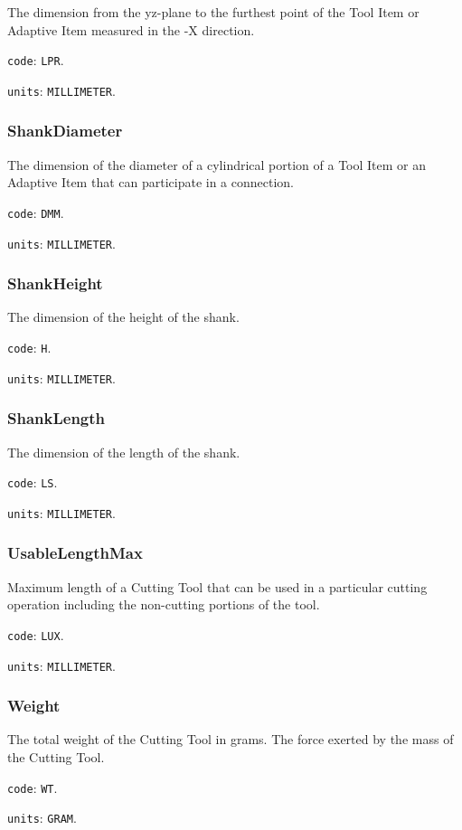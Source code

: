 The dimension from the yz-plane to the furthest point of the Tool Item or Adaptive Item measured in the -X direction.


\texttt{code}: \texttt{LPR}.


\texttt{units}: \texttt{MILLIMETER}.



\subsubsection{ShankDiameter}
\label{sec:ShankDiameter}



The dimension of the diameter of a cylindrical portion of a Tool Item or an Adaptive Item that can participate in a connection.


\texttt{code}: \texttt{DMM}.


\texttt{units}: \texttt{MILLIMETER}.



\subsubsection{ShankHeight}
\label{sec:ShankHeight}



The dimension of the height of the shank.


\texttt{code}: \texttt{H}.


\texttt{units}: \texttt{MILLIMETER}.



\subsubsection{ShankLength}
\label{sec:ShankLength}



The dimension of the length of the shank.


\texttt{code}: \texttt{LS}.


\texttt{units}: \texttt{MILLIMETER}.



\subsubsection{UsableLengthMax}
\label{sec:UsableLengthMax}



Maximum length of a Cutting Tool that can be used in a particular cutting operation including the non-cutting portions of the tool.


\texttt{code}: \texttt{LUX}.


\texttt{units}: \texttt{MILLIMETER}.



\subsubsection{Weight}
\label{sec:Weight}



The total weight of the Cutting Tool in grams. The force exerted by the mass of the Cutting Tool.


\texttt{code}: \texttt{WT}.


\texttt{units}: \texttt{GRAM}.


